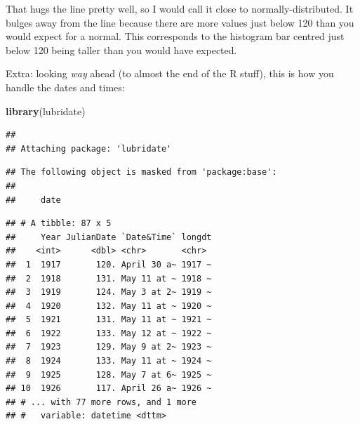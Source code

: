 \documentclass[]{tufte-book}
\newenvironment{Shaded}{}{}
\newcommand{\DataTypeTok}[1]{\textcolor[rgb]{0.56,0.13,0.00}{#1}}
\newcommand{\KeywordTok}[1]{\textcolor[rgb]{0.00,0.44,0.13}{\textbf{#1}}}
\newcommand{\NormalTok}[1]{#1}
\newcommand{\OperatorTok}[1]{\textcolor[rgb]{0.40,0.40,0.40}{#1}}
\newcommand{\StringTok}[1]{\textcolor[rgb]{0.25,0.44,0.63}{#1}}
\theoremstyle{definition}
\theoremstyle{definition}
\theoremstyle{definition}
\theoremstyle{remark}
\begin{document}
That hugs the line pretty well, so I would call it close to
normally-distributed. It bulges away from the line because there are
more values just below 120 than you would expect for a normal. This
corresponds to the histogram bar centred just below 120 being taller
than you would have expected.

Extra: looking \emph{way} ahead (to almost the end of the R stuff), this
is how you handle the dates and times:

\begin{Shaded}
\begin{Highlighting}[]
\KeywordTok{library}\NormalTok{(lubridate)}
\end{Highlighting}
\end{Shaded}

\begin{verbatim}
## 
## Attaching package: 'lubridate'
\end{verbatim}

\begin{verbatim}
## The following object is masked from 'package:base':
## 
##     date
\end{verbatim}

\begin{Shaded}
\end{Shaded}

\begin{verbatim}
## # A tibble: 87 x 5
##     Year JulianDate `Date&Time` longdt
##    <int>      <dbl> <chr>       <chr> 
##  1  1917       120. April 30 a~ 1917 ~
##  2  1918       131. May 11 at ~ 1918 ~
##  3  1919       124. May 3 at 2~ 1919 ~
##  4  1920       132. May 11 at ~ 1920 ~
##  5  1921       131. May 11 at ~ 1921 ~
##  6  1922       133. May 12 at ~ 1922 ~
##  7  1923       129. May 9 at 2~ 1923 ~
##  8  1924       133. May 11 at ~ 1924 ~
##  9  1925       128. May 7 at 6~ 1925 ~
## 10  1926       117. April 26 a~ 1926 ~
## # ... with 77 more rows, and 1 more
## #   variable: datetime <dttm>
\end{verbatim}
\end{document}
